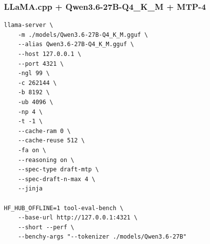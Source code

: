 \documentclass{article}
\begin{document}
\subsubsection{LLaMA.cpp + Qwen3.6-27B-Q4\_K\_M + MTP-4}
\begin{lstlisting}
llama-server \
    -m ./models/Qwen3.6-27B-Q4_K_M.gguf \
    --alias Qwen3.6-27B-Q4_K_M.gguf \
    --host 127.0.0.1 \
    --port 4321 \
    -ngl 99 \
    -c 262144 \
    -b 8192 \
    -ub 4096 \
    -np 4 \
    -t -1 \
    --cache-ram 0 \
    --cache-reuse 512 \
    -fa on \
    --reasoning on \
    --spec-type draft-mtp \
    --spec-draft-n-max 4 \
    --jinja

HF_HUB_OFFLINE=1 tool-eval-bench \
    --base-url http://127.0.0.1:4321 \
    --short --perf \
    --benchy-args "--tokenizer ./models/Qwen3.6-27B"
\end{lstlisting}
\end{document}
